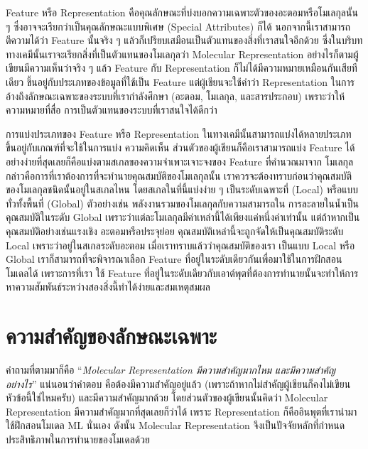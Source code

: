 Feature หรือ Representation คือคุณลักษณะที่บ่งบอกความเฉพาะตัวของอะตอมหรือโมเลกุลนั้น ๆ ซึ่งอาจจะเรียกว่าเป็นคุณลักษณะแบบพิเศษ
(Special Attributes) ก็ได้ นอกจากนี้เราสามารถตีความได้ว่า Feature นั้นจริง ๆ แล้วก็เปรียบเสมือนเป็นตัวแทนของสิ่งที่เราสนใจอีกด้วย
ซึ่งในบริบททางเคมีนั้นเราจะเรียกสิ่งที่เป็นตัวแทนของโมเลกุลว่า Molecular Representation อย่างไรก็ตามผู้เขียนมีความเห็นว่าจริง ๆ แล้ว
Feature กับ Representation ก็ไม่ได้มีความหมายเหมือนกันเสียทีเดียว ขึ้นอยู่กับประเภทของข้อมูลที่ใช้เป็น Feature แต่ผู้เขียนจะใช้คำว่า
Representation ในการอ้างถึงลักษณะเฉพาะของระบบที่เรากำลังศึกษา (อะตอม, โมเลกุล, และสารประกอบ) เพราะว่าให้ความหมายที่สื่อ%
การเป็นตัวแทนของระบบที่เราสนใจได้ดีกว่า\autocite{stepisnik2021}

การแบ่งประเภทของ Feature หรือ Representation ในทางเคมีนั้นสามารถแบ่งได้หลายประเภท ขึ้นอยู่กับเกณฑ์ที่จะใช้ในการแบ่ง ความคิดเห็น%
ส่วนตัวของผู้เขียนก็คือเราสามารถแบ่ง Feature ได้อย่างง่ายที่สุดเลยก็คือแบ่งตามสเกลของความจำเพาะเจาะจงของ Feature ที่คำนวณมาจาก%
โมเลกุล กล่าวคือการที่เราต้องการที่จะทำนายคุณสมบัติของโมเลกุลนั้น เราควรจะต้องทราบก่อนว่าคุณสมบัติของโมเลกุลชนิดนั้นอยู่ในสเกลไหน
โดยสเกลในที่นี้แบ่งง่าย ๆ เป็นระดับเฉพาะที่ (Local) หรือแบบทั่วทั้งพื้นที่ (Global) ตัวอย่างเช่น พลังงานรวมของโมเลกุลกับความสามารถใน%
การละลายในน้ำเป็นคุณสมบัติในระดับ Global เพราะว่าแต่ละโมเลกุลมีค่าเหล่านี้ได้เพียงแค่หนึ่งค่าเท่านั้น แต่ถ้าหากเป็นคุณสมบัติอย่างเช่นแรงเชิง%
อะตอมหรือประจุย่อย คุณสมบัติเหล่านี้จะถูกจัดให้เป็นคุณสมบัติระดับ Local เพราะว่าอยู่ในสเกลระดับอะตอม เมื่อเราทราบแล้วว่าคุณสมบัติของเรา%
เป็นแบบ Local หรือ Global เราก็สามารถที่จะพิจารณาเลือก Feature ที่อยู่ในระดับเดียวกันเพื่อมาใช้ในการฝึกสอนโมเดลได้ เพราะการที่เรา%
ใช้ Feature ที่อยู่ในระดับเดียวกับเอาต์พุตที่ต้องการทำนายนั้นจะทำให้การหาความสัมพันธ์ระหว่างสองสิ่งนี้ทำได้ง่ายและสมเหตุสมผล

\section{ความสำคัญของลักษณะเฉพาะ}
\label{sec:why_feature}

คำถามที่ตามมาก็คือ \enquote{\textit{Molecular Representation มีความสำคัญมากไหม และมีความสำคัญอย่างไร}} แน่นอนว่าคำตอบ%
คือต้องมีความสำคัญอยู่แล้ว (เพราะถ้าหากไม่สำคัญผู้เขียนก็คงไม่เขียนหัวข้อนี้ใช่ไหมครับ) และมีความสำคัญมากด้วย โดยส่วนตัวของผู้เขียนนั้นคิดว่า
Molecular Representation มีความสำคัญมากที่สุดเลยก็ว่าได้ เพราะ Representation ก็คืออินพุตที่เรานำมาใช้ฝึกสอนโมเดล ML นั่นเอง
ดังนั้น Molecular Representation จึงเป็นปัจจัยหลักที่กำหนดประสิทธิภาพในการทำนายของโมเดลด้วย

